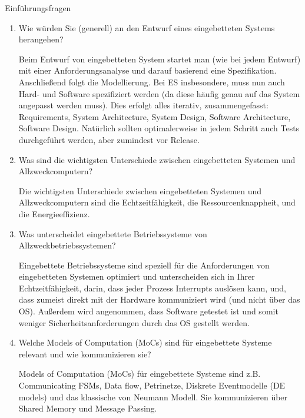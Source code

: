 \documentclass{article}
\begin{document}
\begin{exercise}{Einführungsfragen}
  \begin{enumerate}
    \item Wie würden Sie (generell) an den Entwurf eines eingebetteten Systems herangehen?

          \begin{solution}
            Beim Entwurf von eingebetteten System startet man (wie bei jedem Entwurf) mit einer Anforderungsanalyse und darauf basierend eine Spezifikation. Anschließend folgt die Modellierung. Bei ES insbesondere, muss nun auch Hard- und Software spezifiziert werden (da diese häufig genau auf das System angepasst werden muss). Dies erfolgt alles iterativ, zusammengefasst: Requirements, System Architecture, System Design, Software Architecture, Software Design. Natürlich sollten optimalerweise in jedem Schritt auch Tests durchgeführt werden, aber zumindest vor Release.
          \end{solution}

    \item Was sind die wichtigsten Unterschiede zwischen eingebetteten Systemen und Allzweckcomputern?

          \begin{solution}
            Die wichtigsten Unterschiede zwischen eingebetteten Systemen und Allzweckcomputern sind die Echtzeitfähigkeit, die Ressourcenknappheit, und die Energieeffizienz.
          \end{solution}

    \item Was unterscheidet eingebettete Betriebssysteme von Allzweckbetriebssystemen?

          \begin{solution}
            Eingebettete Betriebssysteme sind speziell für die Anforderungen von eingebetteten Systemen optimiert und unterscheiden sich in Ihrer Echtzeitfähigkeit, darin, dass jeder Prozess Interrupts auslösen kann, und, dass zumeist direkt mit der Hardware kommuniziert wird (und nicht über das OS). Außerdem wird angenommen, dass Software getestet ist und somit weniger Sicherheitsanforderungen durch das OS gestellt werden.
          \end{solution}

    \item Welche Models of Computation (MoCs) sind für eingebettete Systeme relevant und wie kommunizieren sie?

          \begin{solution}
            Models of Computation (MoCs) für eingebettete Systeme sind z.B. Communicating FSMs, Data flow, Petrinetze, Diskrete Eventmodelle (DE models) und das klassische von Neumann Modell. Sie kommunizieren über Shared Memory und Message Passing.
          \end{solution}
  \end{enumerate}
\end{exercise}
\end{document}
